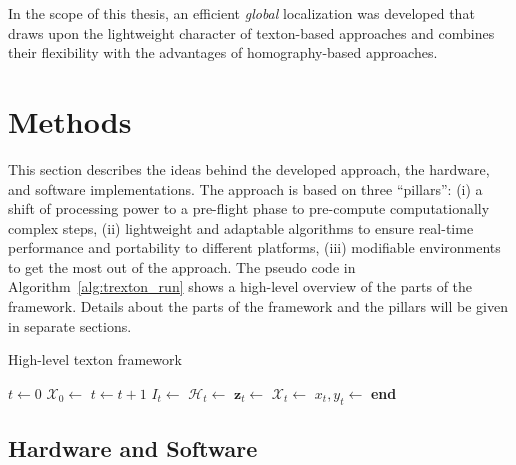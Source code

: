 \documentclass[11pt]{report}
\begin{document}
In the scope of this thesis, an efficient \emph{global} localization
was developed that draws upon the lightweight character of
texton-based approaches and combines their flexibility with the
advantages of homography-based approaches.

\chapter{Methods}
\label{chap:methods}

This section describes the ideas behind the developed approach, the
hardware, and software implementations.
The approach is based on three ``pillars'': (i) a shift of processing
power to a pre-flight phase to pre-compute computationally complex
steps, (ii) lightweight and adaptable algorithms to ensure real-time
performance and portability to different platforms, (iii) modifiable
environments to get the most out of the approach. The pseudo code in
Algorithm~\ref{alg:trexton_run} shows a high-level overview of the
parts of the framework. Details about the parts of the framework and
the pillars will be given in separate sections.
\begin{algorithm}
    \caption{High-level texton framework}
    \label{alg:trexton_run}
    \begin{algorithmic}[1]
      \State $t \gets 0$
      \State $\mathcal{X}_0 \gets$ 
      \State $t \gets t+1$ \State
      $I_t \gets$  \State
      $\mathcal{H}_t \gets$ 
      \State $\mathbf{z}_t \gets$
      \State $\mathcal{X}_t \gets$
      \State $x_t, y_t \gets$ 
      \EndWhile
\State \textbf{end}
    \end{algorithmic}
  \end{algorithm}  
\section{Hardware and Software}
\label{sec:hardware}
\end{document}
